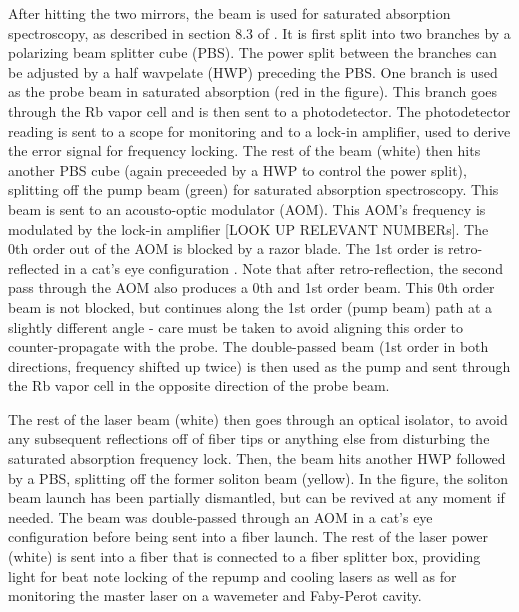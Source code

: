 After hitting the two mirrors, the beam is used for saturated absorption spectroscopy, as described in section 8.3 of \cite{Foot}. It is first split into two branches by a polarizing beam splitter cube (PBS). The power split between the branches can be adjusted by a half wavpelate (HWP) preceding the PBS. One branch is used as the probe beam in saturated absorption (red in the figure). This branch goes through the Rb vapor cell and is then sent to a photodetector. The photodetector reading is sent to a scope for monitoring and to a lock-in amplifier, used to derive the error signal for frequency locking.  The rest of the beam (white) then hits another PBS cube (again preceeded by a HWP to control the power split), splitting off the pump beam (green) for saturated absorption spectroscopy. This beam is sent to an acousto-optic modulator (AOM). This AOM's frequency is modulated by the lock-in amplifier [LOOK UP RELEVANT NUMBERs]. The 0th order out of the AOM is blocked by a razor blade. The 1st order is retro-reflected in a cat's eye configuration \cite{Donley2005}. Note that after retro-reflection, the second pass through the AOM also produces a 0th and 1st order beam. This 0th order beam is not blocked, but continues along the 1st order (pump beam) path at a slightly different angle - care must be taken to avoid aligning this order to counter-propagate with the probe.   The double-passed beam (1st order in both directions, frequency shifted up twice) is then used as the pump and sent through the Rb vapor cell in the opposite direction of the probe beam.  

The rest of the laser beam (white) then goes through an optical isolator, to avoid any subsequent reflections off of fiber tips or anything else from disturbing the saturated absorption frequency lock. Then, the beam hits another HWP followed by a PBS, splitting off the former soliton beam (yellow). In the figure, the soliton beam launch has been partially dismantled, but can be revived at any moment if needed. The beam was double-passed through an AOM in a cat's eye configuration before being sent into a fiber launch. The rest of the laser power (white) is sent into a fiber that is connected to  a fiber splitter box, providing light for beat note locking of the \Rb{} repump and cooling lasers as well as for monitoring the master laser on a wavemeter and Faby-Perot cavity. 

